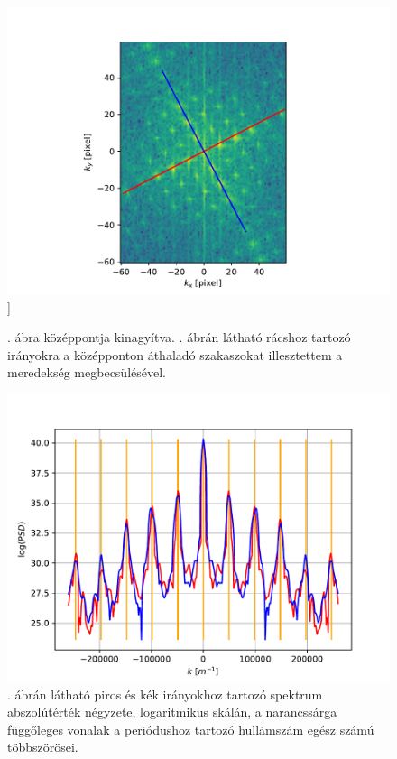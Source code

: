 \documentclass[pdftex,12pt,a4paper]{article}
\begin{document}
		\begin{figure}[H]
			\centering
			\includegraphics[scale=1]{./figs/fftlines.pdf}]
			\caption{. ábra középpontja kinagyítva. . ábrán látható rácshoz tartozó irányokra a középponton áthaladó szakaszokat illesztettem a meredekség megbecsülésével.}
			\label{fftlines}
		\end{figure}
		\begin{figure}[H]
			\centering
			\includegraphics[scale=1]{./figs/1dpsd.pdf}
			\caption{. ábrán látható piros és kék irányokhoz tartozó spektrum abszolútérték négyzete, logaritmikus skálán, a narancssárga függőleges vonalak a periódushoz tartozó hullámszám egész számú többszörösei.}
			\label{1dpsd}
		\end{figure}
	
    
\end{document}

